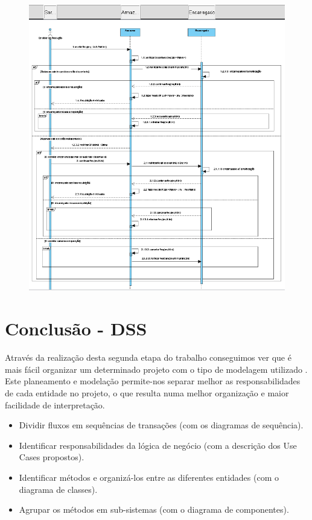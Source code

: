 \documentclass[a4paper]{report}
\begin{document}
\begin{enumerate}
            \begin{figure}[H]
             \centering
             \includegraphics[scale=0.90]{images/UC-Requisicao.PNG}
             \caption{}
            \end{figure}   
        
       
    \end{enumerate}

\chapter{Conclusão - DSS}
Através da realização desta segunda etapa do trabalho conseguimos ver que é mais fácil organizar um determinado projeto com o tipo de modelagem utilizado .\\ 

Este planeamento e modelação permite-nos separar melhor as responsabilidades de cada entidade no projeto, o que resulta numa melhor organização e maior facilidade de interpretação.\\

        \begin{itemize} \par
            \item Dividir fluxos em sequências de transações (com os diagramas de sequência).
            \item Identificar responsabilidades da lógica de negócio (com a descrição dos Use Cases propostos).
            \item Identificar métodos e organizá-los entre as diferentes entidades (com o diagrama de classes).
            \item Agrupar os métodos em sub-sistemas (com o diagrama de componentes).
        \end{itemize}
    
\end{document}
